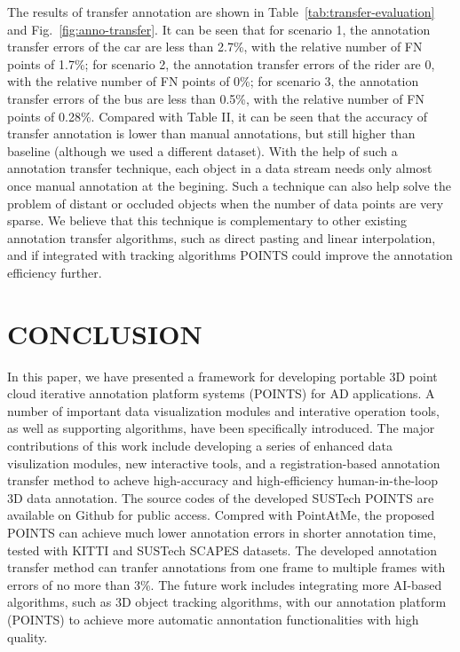 \documentclass[letterpaper, 10 pt, conference]{ieeeconf}  %
\begin{document}
The results of transfer annotation are shown in Table~\ref{tab:transfer-evaluation} and Fig.~\ref{fig:anno-transfer}.
It can be seen that 
for scenario 1, the annotation transfer errors of the car are less than 2.7\%, with the relative number of FN points of 1.7\%;
for scenario 2, the annotation transfer errors of the rider are 0, with the relative number of FN points of 0\%;
for scenario 3, the annotation transfer errors of the bus are less than 0.5\%, with the relative number of FN points of 0.28\%.  
Compared with Table II, it can be seen that the accuracy of transfer annotation is lower than manual annotations, 
but still higher than baseline (although we used a different dataset).
With the help of such a annotation transfer technique, each object in a data stream needs only almost once manual annotation at the begining. 
Such a technique can also help solve the problem of distant or occluded objects when the number of data points are very sparse. 
We believe that this technique is complementary to other existing annotation transfer algorithms, such as direct pasting and linear interpolation, 
and if integrated with tracking algorithms POINTS could improve the annotation efficiency further.




\section{CONCLUSION}
\label{sec:conclusions}

In this paper, we have presented a framework for developing portable 3D point cloud iterative annotation platform systems (POINTS) for AD applications. 
A number of important data visualization modules and interative operation tools, as well as supporting algorithms, have been specifically introduced.
The major contributions of this work include developing a series of enhanced data visulization modules, new interactive tools, and a registration-based annotation transfer method to acheve high-accuracy and high-efficiency human-in-the-loop 3D data annotation.
The source codes of the developed SUSTech POINTS are available on Github for public access.
Compred with PointAtMe, the proposed POINTS can achieve much lower annotation errors in shorter annotation time, tested with KITTI and SUSTech SCAPES datasets. 
The developed annotation transfer method can tranfer annotations from one frame to multiple frames with errors of no more than 3\%.
The future work includes integrating more AI-based algorithms, such as 3D object tracking algorithms, with our annotation platform (POINTS) to achieve more automatic annontation functionalities with high quality.
\end{document}
